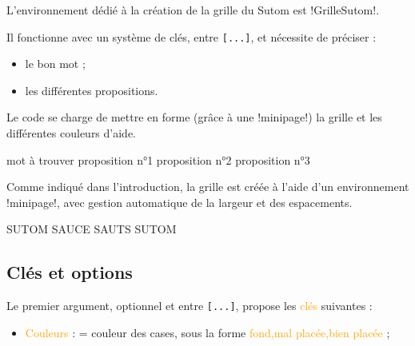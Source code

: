 \documentclass[french,a4paper,11pt]{article}
\newcommand\Cle[1]{{\small\sffamily\textlangle \textcolor{orange}{#1}\textrangle}}
\begin{document}
{\begin{cautionblock}
L'environnement dédié à la création de la grille du Sutom est \packagetex!GrilleSutom!.

Il fonctionne avec un système de clés, entre \texttt{[...]}, et nécessite de préciser :

\begin{itemize}
	\item le bon mot ;
	\item les différentes propositions.
\end{itemize}

Le code se charge de mettre en forme (grâce à une \motcletex!minipage!) la grille et les différentes couleurs d'aide.
\end{cautionblock}

\begin{DemoCode}
\begin{GrilleSutom}[clés]{mot à trouver}
	proposition n°1
	proposition n°2
	proposition n°3
\end{GrilleSutom}
\end{DemoCode}

\begin{noteblock}
Comme indiqué dans l'introduction, la grille est créée à l'aide d'un environnement \motcletex!minipage!, avec gestion automatique de la largeur et des espacements.
\end{noteblock}

\begin{DemoCode}[]
\begin{GrilleSutom}{SUTOM}
	SAUCE
	SAUTS
	SUTOM
\end{GrilleSutom}
\end{DemoCode}

\subsection{Clés et options}

\begin{tipblock}
Le premier argument, optionnel et entre \texttt{[...]}, propose les \Cle{clés} suivantes :

\begin{itemize}
	\item \Cle{Couleurs} : = couleur des cases, sous la forme \Cle{fond,mal placée,bien placée} ;
	

\end{itemize}
\end{tipblock}}
\end{document}
